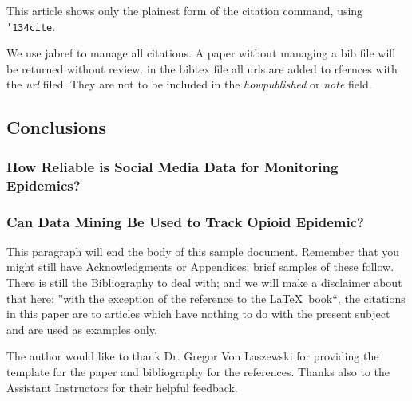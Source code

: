 \documentclass[sigconf]{acmart}
\begin{document}
This article shows only the plainest form of the citation command,
using \texttt{{\char'134}cite}.

We use jabref to manage all citations. A paper without managing a bib
file will be returned without review. in the bibtex file all urls are
added to rfernces with the {\it url} filed. They are not to be
included in the {\it howpublished} or {\it note} field. 


\subsection{Conclusions}


\subsubsection{How Reliable is Social Media Data for Monitoring Epidemics?}


\subsubsection{Can Data Mining Be Used to Track Opioid Epidemic?}


This paragraph will end the body of this sample document.  Remember
that you might still have Acknowledgments or Appendices; brief samples
of these follow.  There is still the Bibliography to deal with; and we
will make a disclaimer about that here: ''with the exception of the
reference to the \LaTeX\ book``, the citations in this paper are to
articles which have nothing to do with the present subject and are
used as examples only.


\begin{acks}

  The author would like to thank Dr. Gregor Von Laszewski for providing the 
  \LaTex template for the paper and \JabRef bibliography for the references. 
  Thanks also to the Assistant Instructors for their helpful feedback.

\end{acks}


 
\end{document}
